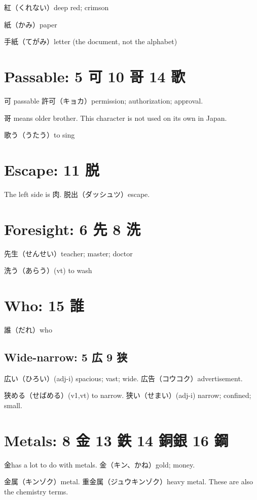 紅（くれない）deep red; crimson

紙（かみ）paper

手紙（てがみ）letter (the document, not the alphabet)

\section{Passable: 5 可 10 哥 14 歌}

可 passable
許可（キョカ）permission; authorization; approval.

哥 means older brother.
This character is not used on its own in Japan.

歌う（うたう）to sing

\section{Escape: 11 脱}

The left side is 肉.
脱出（ダッシュツ）escape.

\section{Foresight: 6 先 8 洗}

先生（せんせい）teacher; master; doctor

洗う（あらう）(vt) to wash

\section{Who: 15 誰}

誰（だれ）who

\subsection{Wide-narrow: 5 広 9 狭}

広い（ひろい）(adj-i) spacious; vast; wide.
広告（コウコク）advertisement.

狭める（せばめる）(v1,vt) to narrow.
狭い（せまい）(adj-i) narrow; confined; small.

\section{Metals: 8 金 13 鉄 14 銅銀 16 鋼}

金has a lot to do with metals.
金（キン、かね）gold; money.

金属（キンゾク）metal.
重金属（ジュウキンゾク）heavy metal.
These are also the chemistry terms.

